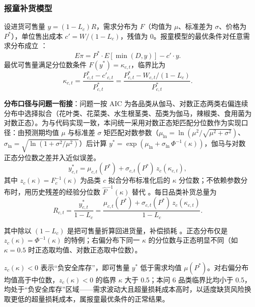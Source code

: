 \subsubsection{报童补货模型}
\label{sec:newsvendor}

设进货可售量 $y=(1-L_c)R$，需求分布为 $F$（均值为 $\mu$、标准差为 $\sigma$、价格为 $P^*$），单位售出成本 $c'=W/(1-L_c)$，残值为 0。报童模型的最优条件对任意需求分布成立 \cite{silver2016,arrow1951,khouja1999,petruzzi1999}：
\begin{equation}
E\pi=P^*\cdot E[\min(D,y)]-c'\cdot y.
\end{equation}
最优可售量满足分位数条件 $F(y^*)=\kappa_{c,t}$，临界比为
\begin{equation}
\kappa_{c,t}=\frac{P^*_{c,t}-c'_{c,t}}{P^*_{c,t}}=\frac{P^*_{c,t}-W_{c,t}/(1-L_c)}{P^*_{c,t}}.
\end{equation}

\textbf{分布口径与问题一衔接}：问题一按 AIC 为各品类从伽马、对数正态两类右偏连续分布中选择拟合（花叶类、花菜类、水生根茎类、茄类为伽马，辣椒类、食用菌为对数正态）。为与代码实现一致，本问统一采用对数正态矩匹配分位数作为实现口径：由预测期均值 $\mu$ 与标准差 $\sigma$ 矩匹配对数参数（$\mu_{\ln}=\ln\left(\mu^2/\sqrt{\mu^2+\sigma^2}\right)$、$\sigma_{\ln}=\sqrt{\ln\left(1+\sigma^2/\mu^2\right)}$）后计算 $y^*=\exp\left(\mu_{\ln}+\sigma_{\ln}\,\Phi^{-1}(\kappa)\right)$，伽马与对数正态分位数之差并入近似误差。
\begin{equation}
y^*_{c,t}=\mu_{c,t}(P^*)+\sigma_{c,t}(P^*)\,z_c(\kappa_{c,t}),
\end{equation}
其中 $z_c(\kappa)=F_c^{-1}(\kappa)$ 为品类 $c$ 拟合分布标准化后的 $\kappa$ 分位数；不依赖参数分布时，用历史残差的经验分位数 $\hat F^{-1}(\kappa)$ 替代 \cite{agrawal1996}。每日品类补货总量为
\begin{equation}
R_{c,t}=\frac{y^*_{c,t}}{1-L_c}=\frac{\mu_{c,t}(P^*)+\sigma_{c,t}(P^*)\,z_c(\kappa_{c,t})}{1-L_c}.
\end{equation}

其中除以 $(1-L_c)$ 是把可售量折算回进货量，补偿损耗 \cite{nahmias1982,bakker2012}。正态分布仅是 $z_c(\kappa)=\Phi^{-1}(\kappa)$ 的特例；右偏分布下同一 $\kappa$ 的分位数与正态明显不同（如 $\kappa=0.5$ 时正态取均值、对数正态取中位数）\cite{agrawal1996}。

$z_c(\kappa)<0$ 表示“负安全库存”，即可售量 $y^*$ 低于需求均值 $\mu(P^*)$。对右偏分布均值高于中位数，$z_c(\kappa)<0$ 的临界 $\kappa$ 大于 0.5；本问 6 品类临界比均小于 0.5，均处于“负安全库存”区域——需求波动大且超量损耗成本高时，以适度缺货风险换取更低的超量损耗成本，属报童最优条件的正常结果。

